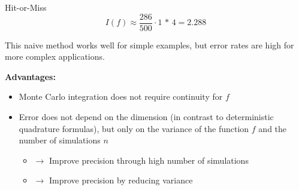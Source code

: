 \begin{vbframe}{Hit-or-Miss}
\normalsize
$$
  I(f) \approx \frac{286}{500} \cdot \text{1 * 4} = 2.288
$$

This naive method works well for simple examples, but error rates are high for more complex applications.

\framebreak






%
%
%
%
%
%
%
%
%
%
%
%
%
%
%
%
%

\framebreak

\textbf{Advantages:}
\begin{itemize}
\item Monte Carlo integration does not require continuity for $f$
\item Error does not depend on the dimension (in contrast to deterministic quadrature formulas), but only on the variance of the function $f$ and the number of simulations $n$
\begin{itemize}
\item $\to$ Improve precision through high number of simulations
\item $\to$ Improve precision by reducing variance
\end{itemize}
\end{itemize}


\end{vbframe}
